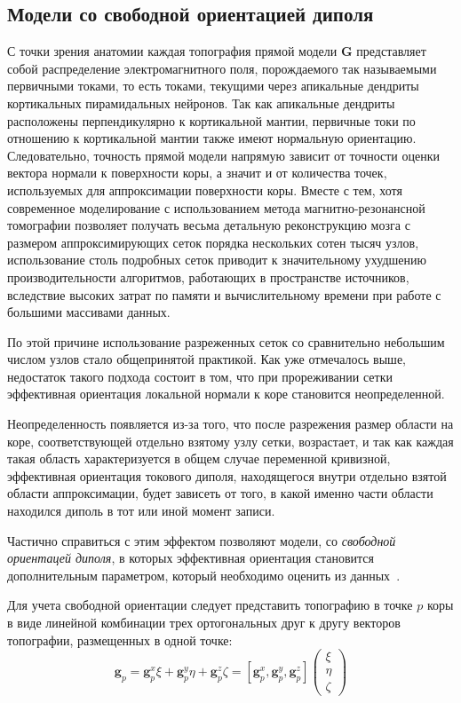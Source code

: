 \subsection{Модели со свободной ориентацией диполя}
С точки зрения анатомии каждая топография прямой модели $\mathbf{G}$
представляет собой распределение электромагнитного поля,
порождаемого так называемыми первичными токами, то есть токами,
текущими через апикальные дендриты кортикальных пирамидальных нейронов.
Так как апикальные дендриты расположены перпендикулярно к кортикальной мантии,
первичные токи по отношению к кортикальной мантии также имеют нормальную ориентацию.
Следовательно, точность прямой модели напрямую зависит от точности оценки вектора нормали
к поверхности коры, а значит и от количества точек, используемых для аппроксимации поверхности коры.
Вместе с тем, хотя современное моделирование с использованием метода магнитно-резонансной
томографии позволяет получать весьма детальную реконструкцию мозга с размером аппроксимирующих сеток
порядка нескольких сотен тысяч узлов, использование столь подробных сеток приводит к значительному
ухудшению производительности алгоритмов, работающих в пространстве источников, вследствие высоких затрат
по памяти и вычислительному времени при работе с большими массивами данных.

По этой причине использование разреженных сеток со сравнительно небольшим числом узлов стало
общепринятой практикой. Как уже отмечалось выше, недостаток такого подхода состоит в том, что
при прореживании сетки эффективная ориентация локальной нормали к коре становится неопределенной.

Неопределенность появляется из-за того, что после разрежения размер области на коре, соответствующей отдельно
взятому узлу сетки, возрастает, и так как каждая такая область характеризуется в общем случае
переменной кривизной, эффективная ориентация токового диполя,
находящегося внутри отдельно взятой области аппроксимации,
будет зависеть от того, в какой именно части области находился диполь в тот или иной момент записи.

Частично справиться с этим эффектом позволяют модели, со \emph{свободной ориентацей диполя},
в которых эффективная ориентация становится дополнительным параметром,
который необходимо оценить из данных~\cite{Lin2006}.

Для учета свободной ориентации следует представить топографию в точке $p$ коры в виде линейной
комбинации трех ортогональных друг к другу векторов топографии, размещенных в одной точке:
\begin{equation}
    \mathbf{g}_p = \mathbf{g}_p^x \xi + \mathbf{g}_p^y \eta + \mathbf{g}_p^z \zeta =
    [\mathbf{g}_p^x, \mathbf{g}_p^y, \mathbf{g}_p^z] \left(
    \begin{array}{ccc}
        \xi \\
        \eta \\
        \zeta
    \end{array}
    \right)
    \label{loose_or}
\end{equation}

